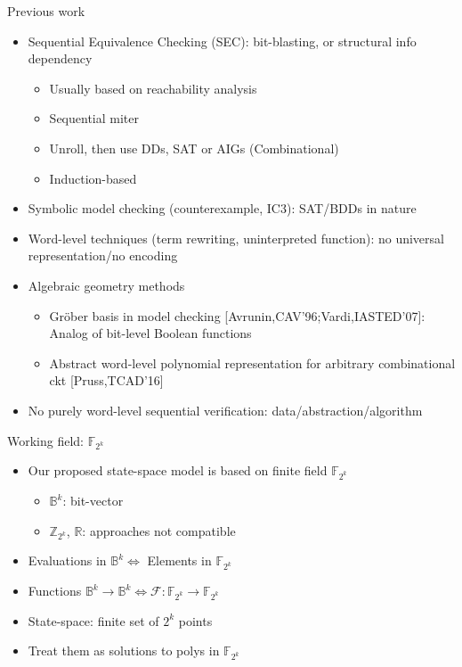 \documentclass[xcolor=dvipsnames]{beamer}
\newcommand{\Fkk}{{\mathbb{F}}_{2^k}}
\newcommand{\Z}{{\mathbb{Z}}}
\newcommand{\bi}{\begin{itemize}}
\newcommand{\ei}{\end{itemize}}
\newcommand{\Func}{{\mathcal{F}}}
\newcommand{\B}{{\mathbb{B}}}
\newcommand{\R}{{\mathbb{R}}}
\begin{document}
\begin{frame}{\large{Previous work}}
\bi
\item Sequential Equivalence Checking (SEC): bit-blasting, or structural info dependency
	\bi
	\item Usually based on reachability analysis
	\item Sequential miter
	\item Unroll, then use DDs, SAT or AIGs (Combinational)
	\item Induction-based
	\ei
\item Symbolic model checking (counterexample, IC3): SAT/BDDs in nature
\item Word-level techniques (term rewriting, uninterpreted function): no universal representation/no encoding
\item Algebraic geometry methods
	\bi
	\item Gr\"ober basis in model checking [Avrunin,CAV'96;Vardi,IASTED'07]: Analog of bit-level Boolean functions
	\item Abstract word-level polynomial representation for arbitrary combinational ckt [Pruss,TCAD'16]
	\ei
\pause
\item No purely word-level sequential verification: data/abstraction/algorithm
\ei
\end{frame}
\begin{frame}{\large{Working field: $\Fkk$}}
\bi
\item Our proposed state-space model is based on finite field $\Fkk$
	\bi
	\item $\B^k$: bit-vector
	\item $\Z_{2^k}$, $\R$: approaches not compatible
	\ei
\item Evaluations in $\B^k \Leftrightarrow$ Elements in $\Fkk$
\item Functions $\B^k\to\B^k \Leftrightarrow \Func:\Fkk\to\Fkk$
\pause
\item State-space: finite set of $2^k$ points
\item Treat them as solutions to polys in $\Fkk$
\ei
\end{frame}
\end{document}
